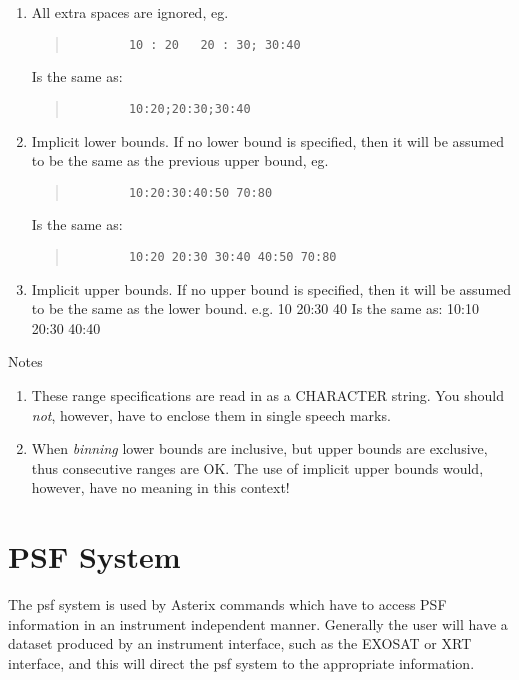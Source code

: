 \documentclass{book}
\renewcommand{\_}{{\tt\char'137}}     %
\begin{document}
\begin{itemize}
\begin{enumerate}
\item All extra spaces are ignored, eg.
\begin{quote}\begin{verbatim}
        10 : 20   20 : 30; 30:40
        \end{verbatim}\end{quote}
Is the same as:
\begin{quote}\begin{verbatim}
        10:20;20:30;30:40
        \end{verbatim}\end{quote}
\item Implicit lower bounds. If no lower bound is specified,
then it will be assumed to be the same as the previous
upper bound, eg. 
 
\begin{quote}\begin{verbatim}
        10:20:30:40:50 70:80
        \end{verbatim}\end{quote}
Is the same as:
\begin{quote}\begin{verbatim}
        10:20 20:30 30:40 40:50 70:80
        \end{verbatim}\end{quote}
\item Implicit upper bounds. If no upper bound is specified,
then it will be assumed to be the same as the lower
bound.
e.g.
10 20:30 40
Is the same as:
10:10 20:30 40:40
\end{enumerate}
\end{itemize}
Notes
 
 
\begin{enumerate}
\item These range specifications are read in as a CHARACTER
string. You should {\em not}, however, have to enclose them in
single speech marks.
\item When {\em binning} lower bounds are inclusive, but upper
bounds are exclusive, thus consecutive ranges are OK.
The use of implicit upper bounds would, however, have no
meaning in this context!
\end{enumerate}
\section{PSF System}
The psf system is used by Asterix commands which have to access
PSF information in an instrument independent manner. Generally
the user will have a dataset produced by an instrument interface,
such as the EXOSAT or XRT interface, and this will direct the psf
system to the appropriate information.
 
\end{document}
